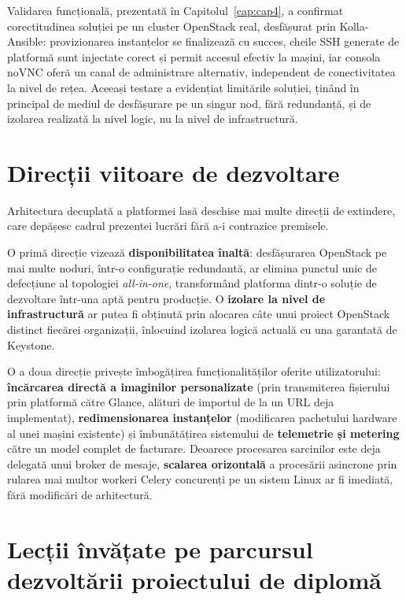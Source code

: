 Validarea funcțională, prezentată în Capitolul~\ref{cap:cap4}, a confirmat corectitudinea soluției pe un cluster OpenStack real, desfășurat prin Kolla-Ansible: provizionarea instanțelor se finalizează cu succes, cheile SSH generate de platformă sunt injectate corect și permit accesul efectiv la mașini, iar consola noVNC oferă un canal de administrare alternativ, independent de conectivitatea la nivel de rețea. Aceeași testare a evidențiat limitările soluției, ținând în principal de mediul de desfășurare pe un singur nod, fără redundanță, și de izolarea realizată la nivel logic, nu la nivel de infrastructură.

\section{Direcții viitoare de dezvoltare}
\label{cap:cap5:directii-viitoare}

Arhitectura decuplată a platformei lasă deschise mai multe direcții de extindere, care depășesc cadrul prezentei lucrări fără a-i contrazice premisele.

O primă direcție vizează \textbf{disponibilitatea înaltă}: desfășurarea OpenStack pe mai multe noduri, într-o configurație redundantă, ar elimina punctul unic de defecțiune al topologiei \textit{all-in-one}, transformând platforma dintr-o soluție de dezvoltare într-una aptă pentru producție. O \textbf{izolare la nivel de infrastructură} ar putea fi obținută prin alocarea câte unui proiect OpenStack distinct fiecărei organizații, înlocuind izolarea logică actuală cu una garantată de Keystone.

O a doua direcție privește îmbogățirea funcționalităților oferite utilizatorului: \textbf{încărcarea directă a imaginilor personalizate} (prin transmiterea fișierului prin platformă către Glance, alături de importul de la un URL deja implementat), \textbf{redimensionarea instanțelor} (modificarea pachetului hardware al unei mașini existente) și îmbunătățirea sistemului de \textbf{telemetrie și metering} către un model complet de facturare. Deoarece procesarea sarcinilor este deja delegată unui broker de mesaje, \textbf{scalarea orizontală} a procesării asincrone prin rularea mai multor workeri Celery concurenți pe un sistem Linux ar fi imediată, fără modificări de arhitectură.

\section{Lecții învățate pe parcursul dezvoltării proiectului de diplomă}
\label{cap:cap5:lectii}


